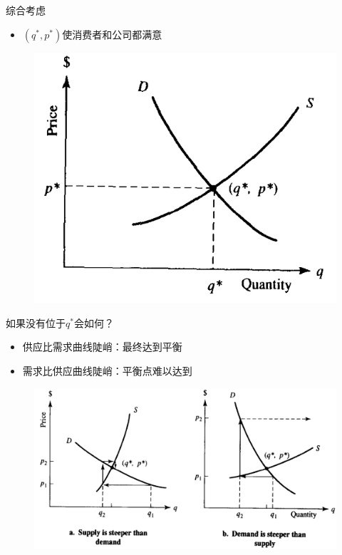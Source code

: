 \documentclass[UTF8]{ctexbeamer}
\begin{document}
\begin{frame}{综合考虑}
  \begin{itemize}
  \item $(q^*, p^*)$使消费者和公司都满意
  \end{itemize}

  \begin{figure}
    \centering
    \includegraphics[width=.5\textwidth]{both.png}
  \end{figure}
  
\end{frame}

\begin{frame}{如果没有位于$q^*$会如何？}
  \begin{itemize}
  \item 供应比需求曲线陡峭：最终达到平衡
  \item 需求比供应曲线陡峭：平衡点难以达到
  \end{itemize}

  \begin{figure}
    \centering
    \includegraphics[width=.7\textwidth]{sd.png}
  \end{figure}

\end{frame}
\end{document}
